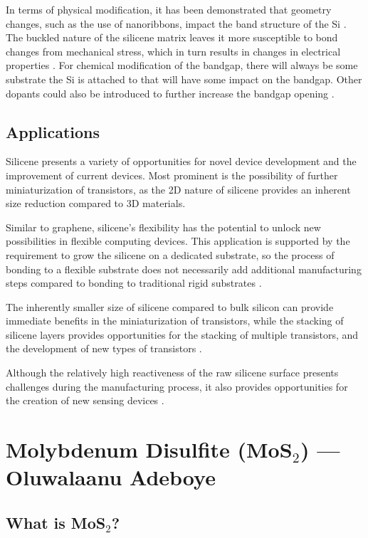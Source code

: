 \documentclass[conference]{IEEEtran}
\begin{document}
In terms of physical modification, it has been demonstrated that geometry changes, such as the use of nanoribbons, impact the band structure of the Si \cite{oc3}. The buckled nature of the silicene matrix leaves it more susceptible to bond changes from mechanical stress, which in turn results in changes in electrical properties \cite{oc2}. For chemical modification of the bandgap, there will always be some substrate the Si is attached to that will have some impact on the bandgap. Other dopants could also be introduced to further increase the bandgap opening \cite{oc1}.

\subsection{Applications}

Silicene presents a variety of opportunities for novel device development and the improvement of current devices. Most prominent is the possibility of further miniaturization of transistors, as the 2D nature of silicene provides an inherent size reduction compared to 3D materials. 

Similar to graphene, silicene's flexibility has the potential to unlock new possibilities in flexible computing devices. This application is supported by the requirement to grow the silicene on a dedicated substrate, so the process of bonding to a flexible substrate does not necessarily add additional manufacturing steps compared to bonding to traditional rigid substrates \cite{oc2}.

The inherently smaller size of silicene compared to bulk silicon can provide immediate benefits in the miniaturization of transistors, while the stacking of silicene layers provides opportunities for the stacking of multiple transistors, and the development of new types of transistors \cite{oc2, oc1}.

Although the relatively high reactiveness of the raw silicene surface presents challenges during the manufacturing process, it also provides opportunities for the creation of new sensing devices \cite{oc2}.

\section{Molybdenum Disulfite (MoS$_2$) — Oluwalaanu Adeboye}

\subsection{What is MoS$_2$?}
\end{document}
